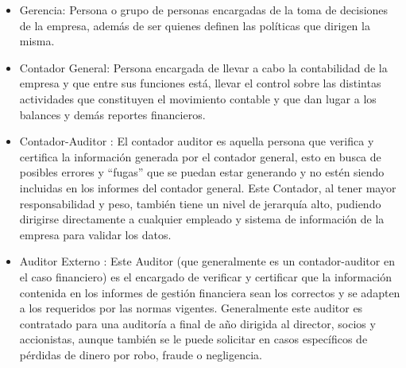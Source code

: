 {	
	
	
	\vspace{3mm}
	
	
	
	\vspace{3mm}
	
	\begin{itemize}
	\item Gerencia: Persona o grupo de personas encargadas de la toma de decisiones de la empresa, además de ser quienes definen las políticas que dirigen la misma.
	\item Contador General​: Persona encargada de llevar a cabo la contabilidad de la empresa y que entre sus funciones está, llevar el control sobre las distintas actividades que constituyen el movimiento contable y que dan lugar a los balances y demás reportes financieros.
	\item Contador-Auditor​ : El contador auditor es aquella persona que verifica y certifica la información generada por el contador general, esto en busca de posibles errores y “fugas” que se puedan estar generando y no estén siendo incluidas en los informes del contador general. Este Contador, al tener mayor responsabilidad y peso, también tiene un nivel de jerarquía alto, pudiendo dirigirse directamente a cualquier empleado y sistema de información de la empresa para validar los datos.
	\item Auditor Externo​ : Este Auditor (que generalmente es un contador-auditor en el caso financiero) es el encargado de verificar y certificar que la información contenida en los informes de gestión financiera sean los correctos y se adapten a los requeridos por las normas vigentes. Generalmente este auditor es contratado para una auditoría a final de año dirigida al director, socios y accionistas, aunque también se le puede solicitar en casos específicos de pérdidas de dinero por robo, fraude o negligencia. 
	\end{itemize}
	
}
